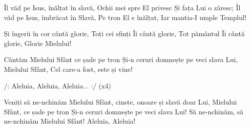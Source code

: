 \beginverse
Îl văd pe Isus, înălțat în slavă,
Ochii mei spre El privesc
Și fața Lui o zăresc;
Îl văd pe Isus, îmbrăcat în Slavă,
Pe tron El e înălțat,
Iar mantia-I umple Templul!
\endverse

\beginverse*
Și îngerii în cor cântă glorie,
Toți cei sfinți Îi cântă glorie,
Tot pământul Îi cântă glorie,
Glorie Mielului!
\endverse

\beginchorus
Cântăm Mielului Sfânt ce șade pe tron
Și-n ceruri domnește pe veci slava Lui,
Mielului Sfânt, Cel care-a fost, este și vine!
\endchorus

\beginverse*
/: Aleluia, Aleluia, Aleluia... :/ (x4)
\endverse

\beginchorus
Veniți să ne-nchinăm
Mielului Sfânt, cinste, onoare și slavă doar Lui,
Mielului Sfânt, ce șade pe tron
Și-n ceruri domnește pe veci slava Lui!
Să ne-nchinăm, să ne-nchinăm Mielului Sfânt!
Aleluia, Aleluia!
\endchorus
\endsong